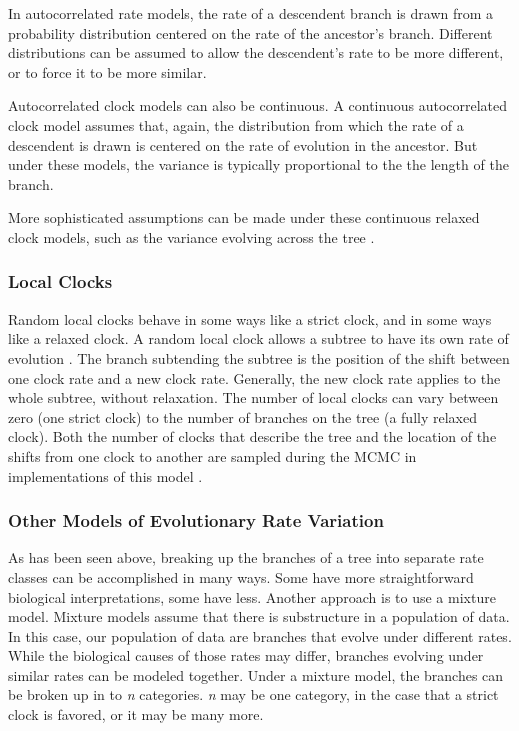 In autocorrelated rate models, the rate of a descendent branch is drawn from a probability distribution \citep{Aris-Brosou2002} centered on the rate of the ancestor's branch. 
Different distributions can be assumed to allow the descendent's rate to be more different, or to force it to be more similar. 


Autocorrelated clock models can also be continuous.
A continuous autocorrelated clock model assumes that, again, the distribution from which the rate of a descendent is drawn is centered on the rate of evolution in the ancestor.
But under these models, the variance is typically proportional to the the length of the branch.

More sophisticated assumptions can be made under these continuous relaxed clock models, such as the variance evolving across the tree \citep{Thorne1998, Kishino2001, Thorne2002, Aris-Brosou2002, Aris-Brosou2003}.

\subsubsection{Local Clocks}

Random local clocks behave in some ways like a strict clock, and in some ways like a relaxed clock. 
A random local clock allows a subtree to have its own rate of evolution \citep{yoder2000}. 
The branch subtending the subtree is the position of the shift between one clock rate and a new clock rate. 
Generally, the new clock rate applies to the whole subtree, without relaxation.
The number of local clocks can vary between zero (one strict clock) to the number of branches on the tree (a fully relaxed clock).
Both the number of clocks that describe the tree and the location of the shifts from one clock to another are sampled during the MCMC in implementations of this model \citep{Drummond2010}. 


\subsubsection{Other Models of Evolutionary Rate Variation}

As has been seen above, breaking up the branches of a tree into separate rate classes can be accomplished in many ways.
Some have more straightforward biological interpretations, some have less. 
Another approach is to use a mixture model.
Mixture models assume that there is substructure in a population of data.
In this case, our population of data are branches that evolve under different rates.
While the biological causes of those rates may differ, branches evolving under similar rates can be modeled together. 
Under a mixture model, the branches can be broken up in to \textit{n} categories.
\textit{n} may be one category, in the case that a strict clock is favored, or it may be many more.

